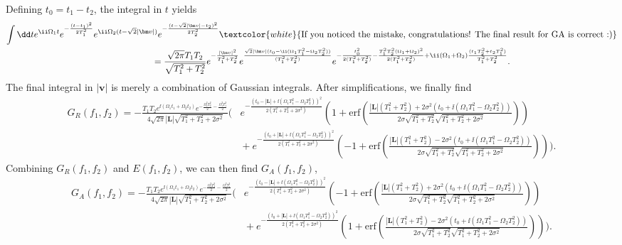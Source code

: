 Defining $t_0 = t_1 - t_2$, the integral in $t$ yields{\footnotesize
\begin{align}
     \int \dd t e^{\ii \Omega_1 t} e^{- \frac{(t-t_1)^2}{2T_1^2}}e^{\ii \Omega_2 (t - \sqrt{2}|\bm v|)}& e^{- \frac{(t - \sqrt{2}|\bm v|-t_2)^2}{2T_2^2}}\nonumber \textcolor{white}{\text{If you noticed the mistake, congratulations! The final result for GA is correct :)}}\\
     &\!\!\!\! = \frac{\sqrt{2\pi}T_1 T_2}{\sqrt{T_1^2 + T_2^2}}e^{- \frac{|\bm v|^2}{T_1^2 + T_2^2}}e^{\frac{\sqrt{2}|\bm v|(t_0- \ii (\Omega_1 T_1^2 - \Omega_2 T_2^2))}{(T_1^2 + T_2^2)}}e^{-\frac{t_0^2}{2(T_1^2 + T_2^2)}-\frac{T_1^2T_2^2(\Omega_1+\Omega_2)^2}{2(T_1^2 + T_2^2)}+\ii(\Omega_1 + \Omega_2)\frac{(t_1 T_2^2 + t_2 T_1^2)}{T_1^2 + T_2^2}}.
\end{align}}
The final integral in $|\bm v|$ is merely a combination of Gaussian integrals. After simplifications, we finally find{\footnotesize
\begin{align}
    G_R(f_1,f_2) = - \frac{T_1T_2e^{\ii (\Omega_1 t_1+\Omega_2 t_2)}e^{- \frac{\Omega_2^2 T_2^2}{2} - \frac{\Omega_1^2 T_1^2}{2}}}{4\sqrt{2\pi}|\bm L|\sqrt{T_1^2 + T_2^2 + 2\sigma^2}}\Bigg(&e^{- \frac{(t_0 - |\bm L|+\ii (\Omega_1 T_1^2- \Omega_2 T_2^2))^2}{2(T_1^2 + T_2^2 + 2\sigma^2)}}\left(1 + \text{erf}\left(\tfrac{|\bm L|(T_1^2+T_2^2)+2\sigma^2(t_0+\ii (\Omega_1 T_1^2- \Omega_2 T_2^2))}{2\sigma\sqrt{T_1^2 + T_2^2}\sqrt{T_1^2 + T_2^2 + 2\sigma^2}}\right)\right)\nonumber\\
    &\!\!\!\!\!\!\!\!\!\!\!\!\!\!\!\!\!\!+e^{- \frac{(t_0 + |\bm L|+\ii (\Omega_1 T_1^2- \Omega_2 T_2^2))^2}{2(T_1^2 + T_2^2 + 2\sigma^2)}}\left(-1+\text{erf}\left(\tfrac{|\bm L|(T_1^2+T_2^2)-2\sigma^2(t_0+\ii (\Omega_1 T_1^2- \Omega_2 T_2^2))}{2\sigma\sqrt{T_1^2 + T_2^2}\sqrt{T_1^2 + T_2^2 + 2\sigma^2}}\right)\right)\Bigg).\label{eq:GRbig}
\end{align}}
Combining $G_R(f_1,f_2)$ and $E(f_1,f_2)$, we can then find $G_A(f_1,f_2)$,{\footnotesize
\begin{align}
    G_A(f_1,f_2) = - \frac{T_1T_2e^{\ii (\Omega_1 t_1+\Omega_2 t_2)}e^{- \frac{\Omega_2^2 T_2^2}{2} - \frac{\Omega_1^2 T_1^2}{2}}}{4\sqrt{2\pi}|\bm L|\sqrt{T_1^2 + T_2^2 + 2\sigma^2}}\Bigg(&e^{- \frac{(t_0 - |\bm L|+\ii (\Omega_1 T_1^2- \Omega_2 T_2^2))^2}{2(T_1^2 + T_2^2 + 2\sigma^2)}}\left(-1 + \text{erf}\left(\tfrac{|\bm L|(T_1^2+T_2^2)+2\sigma^2(t_0+\ii (\Omega_1 T_1^2- \Omega_2 T_2^2))}{2\sigma\sqrt{T_1^2 + T_2^2}\sqrt{T_1^2 + T_2^2 + 2\sigma^2}}\right)\right)\nonumber\\
    &\!\!\!\!\!\!\!\!\!\!\!\!\!\!\!\!\!\!+e^{- \frac{(t_0 + |\bm L|+\ii (\Omega_1 T_1^2- \Omega_2 T_2^2))^2}{2(T_1^2 + T_2^2 + 2\sigma^2)}}\left(1+\text{erf}\left(\tfrac{|\bm L|(T_1^2+T_2^2)-2\sigma^2(t_0+\ii (\Omega_1 T_1^2- \Omega_2 T_2^2))}{2\sigma\sqrt{T_1^2 + T_2^2}\sqrt{T_1^2 + T_2^2 + 2\sigma^2}}\right)\right)\Bigg).\label{eq:GAbig}
\end{align}}
